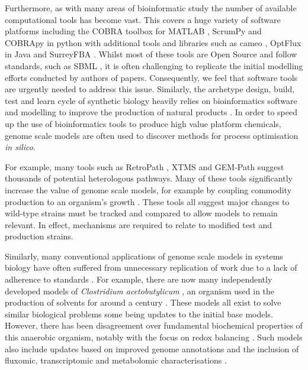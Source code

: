 \documentclass[journal=asbcd6]{achemso}
\begin{document}
Furthermore, as with many areas of bioinformatic study the number of available computational tools has become vast.
This covers a huge variety of software platforms including the COBRA toolbox for MATLAB \cite{schellenberger2011quantitative}, ScrumPy and COBRApy in python \cite{poolman2006scrumpy, ebrahim2013cobrapy} with additional tools and libraries such as cameo \cite{cardoso2018cameo}, OptFlux in Java \cite{rocha2010optflux} and SurreyFBA \cite{gevorgyan2010surreyfba}.
Whilst most of these tools are Open Source and follow standards, such as SBML \cite{finney2003systems}, it is often challenging to replicate the initial modelling efforts conducted by authors of papers.
Consequently, we feel that software tools are urgently needed to address this issue.
Similarly, the archetype design, build, test and learn cycle of synthetic biology heavily relies on bioinformatics software and modelling to improve the production of natural products \cite{carbonell2016bioinformatics}.
In order to speed up the use of bioinformatics tools to produce high value platform chemicals, genome scale models are often used to discover methods for process optimisation \textit{in silico}.

For example, many tools such as RetroPath \cite{carbonell2013retropath}, XTMS \cite{carbonell2014xtms} and GEM-Path \cite{campodonico2014generation} suggest thousands of potential heterologous pathways.
Many of these tools significantly increase the value of genome scale models, for example by coupling commodity production to an organism's growth \cite{feist2010model}.
These tools all suggest major changes to wild-type strains must be tracked and compared to allow models to remain relevant.
In effect, mechanisms are required to relate to modified test and production strains.

Similarly, many conventional applications of genome scale models in systems biology have often suffered from unnecessary replication of work due to a lack of adherence to standards \cite{monk2014}.
For example, there are now many independently developed models of \textit{Clostridium acetobutylicum} \cite{lee2008genome, senger2008genome, mcanulty2012genome, dash2014capturing, yoo2015quantitative}, an organism used in the production of solvents for around a century \cite{moon2016one, 1919charles}.
These models all exist to solve similar biological problems some being updates to the initial base models. 
However, there has been disagreement over fundamental biochemical properties of this anaerobic organism, notably with the focus on redox balancing \cite{dash2014capturing}.
Such models also include updates based on improved genome annotations and the inclusion of fluxomic, transcriptomic and metabolomic characterisations \cite{yoo2015quantitative}.
\end{document}
